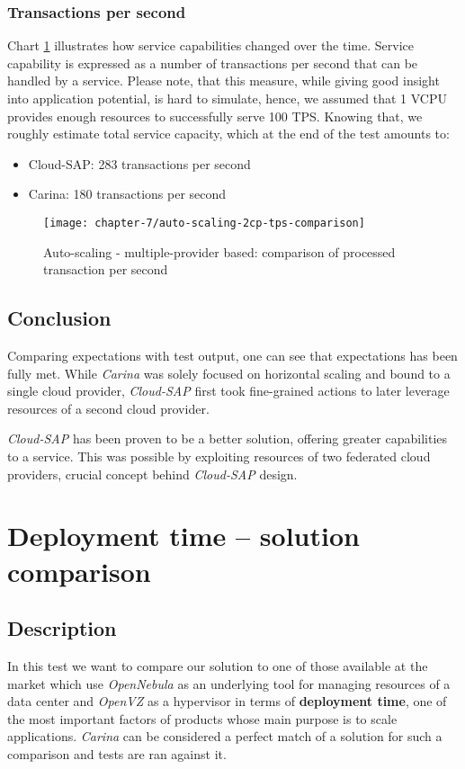 \subsubsection*{Transactions per second}
Chart \ref{eval:auto-scaling-2cp-tps-comparison} illustrates how service capabilities changed over the time. Service capability is expressed as a number of transactions per second that can be handled by a service. Please note, that this measure, while giving good insight into application potential, is hard to simulate, hence, we assumed that 1 VCPU provides enough resources to successfully serve 100 TPS. Knowing that, we roughly estimate total service capacity, which at the end of the test amounts to:
\begin{itemize}
 \item Cloud-SAP: 283 transactions per second
 \item Carina: 180 transactions per second
\end{itemize}

\begin{figure}[!ht]
  \begin{center}
    \texttt{[image: chapter-7/auto-scaling-2cp-tps-comparison]}
  \end{center}
  \caption{Auto-scaling - multiple-provider based: comparison of processed transaction per second}
  \label{eval:auto-scaling-2cp-tps-comparison}
\end{figure}

\subsection*{Conclusion}
Comparing expectations with test output, one can see that expectations has been fully met. While \emph{Carina} was solely focused on horizontal scaling and bound to a single cloud provider, \emph{Cloud-SAP} first took fine-grained actions to later leverage resources of a second cloud provider.

\emph{Cloud-SAP} has been proven to be a better solution, offering greater capabilities to a service. This was possible by exploiting resources of two federated cloud providers, crucial concept behind \emph{Cloud-SAP} design.

\newpage
\section{Deployment time -- solution comparison}
\subsection*{Description}
In this test we want to compare our solution to one of those available at the market which use \emph{OpenNebula} as an underlying tool for managing resources of a data center and \emph{OpenVZ} as a hypervisor in terms of \textbf{deployment time}, one of the most important factors of products whose main purpose is to scale applications.
\emph{Carina} \cite{Carina} can be considered a perfect match of a solution for such a comparison and tests are ran against it.

